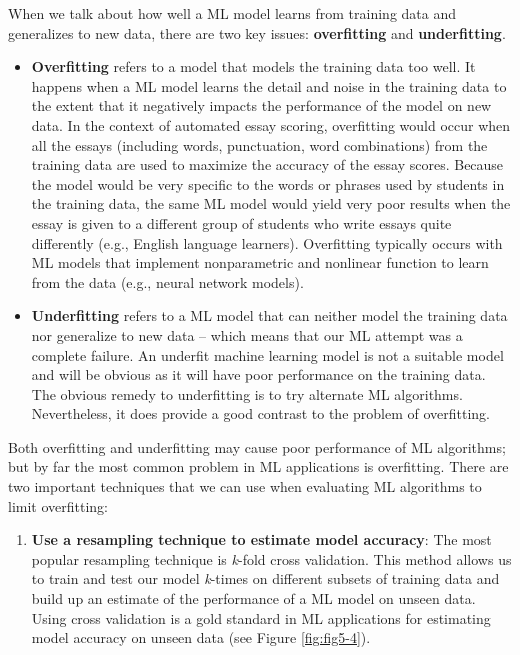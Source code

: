 \documentclass[
]{book}
\providecommand{\tightlist}{%
  \setlength{\itemsep}{0pt}\setlength{\parskip}{0pt}}
\begin{document}
When we talk about how well a ML model learns from training data and generalizes to new data, there are two key issues: \textbf{overfitting} and \textbf{underfitting}.

\begin{itemize}
\item
  \textbf{Overfitting} refers to a model that models the training data too well. It happens when a ML model learns the detail and noise in the training data to the extent that it negatively impacts the performance of the model on new data. In the context of automated essay scoring, overfitting would occur when all the essays (including words, punctuation, word combinations) from the training data are used to maximize the accuracy of the essay scores. Because the model would be very specific to the words or phrases used by students in the training data, the same ML model would yield very poor results when the essay is given to a different group of students who write essays quite differently (e.g., English language learners). Overfitting typically occurs with ML models that implement nonparametric and nonlinear function to learn from the data (e.g., neural network models).
\item
  \textbf{Underfitting} refers to a ML model that can neither model the training data nor generalize to new data -- which means that our ML attempt was a complete failure. An underfit machine learning model is not a suitable model and will be obvious as it will have poor performance on the training data. The obvious remedy to underfitting is to try alternate ML algorithms. Nevertheless, it does provide a good contrast to the problem of overfitting.
\end{itemize}

Both overfitting and underfitting may cause poor performance of ML algorithms; but by far the most common problem in ML applications is overfitting. There are two important techniques that we can use when evaluating ML algorithms to limit overfitting:

\begin{enumerate}
\def\labelenumi{\arabic{enumi}.}
\tightlist
\item
  \textbf{Use a resampling technique to estimate model accuracy}: The most popular resampling technique is \emph{k}-fold cross validation. This method allows us to train and test our model \emph{k}-times on different subsets of training data and build up an estimate of the performance of a ML model on unseen data. Using cross validation is a gold standard in ML applications for estimating model accuracy on unseen data (see Figure \ref{fig:fig5-4}).
\end{enumerate}
\end{document}
